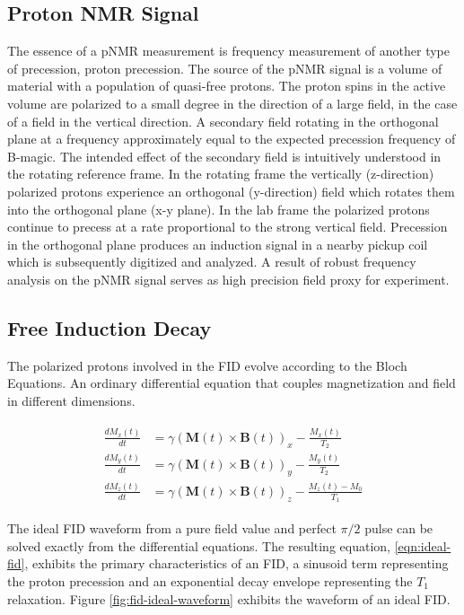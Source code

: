 \subsection{Proton NMR Signal}

The essence of a pNMR measurement is frequency measurement of another type of precession, proton precession.  The source of the pNMR signal is a volume of material with a population of quasi-free protons.  The proton spins in the active volume are polarized to a small degree in the direction of a large field, in the case of \gmtwo a \bmagic field in the vertical direction.  A secondary field rotating in the orthogonal plane at a frequency approximately equal to the expected precession frequency of B-magic.  The intended effect of the secondary field is intuitively understood in the rotating reference frame.  In the rotating frame the vertically (z-direction) polarized protons experience an orthogonal (y-direction) field which rotates them into the orthogonal plane (x-y plane).  In the lab frame the polarized protons continue to precess at a rate proportional to the strong vertical field.  Precession in the orthogonal plane produces an induction signal in a nearby pickup coil which is subsequently digitized and analyzed.  A result of robust frequency analysis on the pNMR signal serves as high precision field proxy for \gmtwo experiment.

\subsection{Free Induction Decay}

The polarized protons involved in the FID evolve according to the Bloch Equations.  An ordinary differential equation that couples magnetization and field in different dimensions.

\begin{align}
\begin{split}
\label{eqn:bloch}
\frac{dM_x(t)}{dt} & = \gamma (\mathbf{M}(t) \times \mathbf{B}(t))_x - \frac{M_x(t)}{T_2} \\
\frac{dM_y(t)}{dt} & = \gamma (\mathbf{M}(t)\times \mathbf{B}(t))_y - \frac{M_y(t)}{T_2} \\
\frac{dM_z(t)}{dt} & = \gamma (\mathbf{M}(t) \times \mathbf{B}(t))_z - \frac{M_z(t) - M_0}{T_1}
\end{split} 
\end{align}

The ideal FID waveform from a pure field value and perfect $\pi/2$ pulse can be solved exactly from the differential equations.  The resulting equation, \ref{eqn:ideal-fid}, exhibits the primary characteristics of an FID, a sinusoid term representing the proton precession and an exponential decay envelope representing the $T_1$ relaxation.  Figure \ref{fig:fid-ideal-waveform} exhibits the waveform of an ideal FID.

